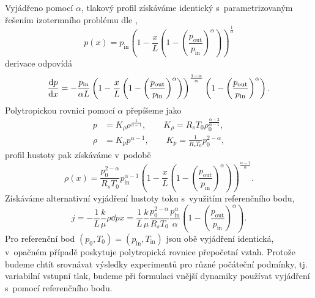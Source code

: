 Vyjádřeno pomocí $\alpha$, tlakový profil získáváme identický s~parametrizovaným řešením izotermního problému dle ,
\begin{equation}
    p(x)=p_{\mathrm{in}}\left(1-\frac{x}{L}\left(1-\left(\frac{p_{\mathrm{out}}}{p_{\mathrm{in}}}\right)^\alpha\right)\right)^{\frac{1}{\alpha}}
\end{equation}
derivace odpovídá
\begin{equation}
    \frac{\mathrm{d} p}{\mathrm{d} x}=-\frac{p_{\mathrm{in}}}{\alpha L}\left(1-\frac{x}{L}\left(1-\left(\frac{p_{\mathrm{out}}}{p_{\mathrm{in}}}\right)^{\alpha}\right)\right)^{\frac{1-\alpha}{\alpha}}\left(1-\left(\frac{p_{\mathrm{out}}}{p_{\mathrm{in}}}\right)^{\alpha}\right).
\end{equation}
Polytropickou rovnici pomocí $\alpha$ přepíšeme jako
\begin{subequations}
    \begin{align}
        p&=K_{\rho} \rho^{\frac{1}{\alpha-1}},\qquad K_\rho = R_s T_0\rho_0^{\frac{\alpha-2}{\alpha-1}},\\
        \rho&=K_p p^{\alpha-1},\qquad K_p=\frac{1}{R_s T_0} p_0^{2-\alpha},
    \end{align}
\end{subequations}
profil hustoty pak získáváme v~podobě
\begin{equation}
    \rho(x)=\frac{p_0^{2-\alpha}}{R_s T_0}p_{\mathrm{in}}^{\alpha-1}\left(1-\frac{x}{L}\left(1-\left(\frac{p_{\mathrm{out}}}{p_{\mathrm{in}}}\right)^{\alpha}\right)\right)^{\frac{\alpha-1}{\alpha}}.
\end{equation}
Získáváme alternativní vyjádření hustoty toku s~využitím referenčního bodu,
\begin{equation}\label{eq:pme_mass_flux_reference}
    j=-\frac{1}{L}\frac{k}{\mu}\rho \dd{p}{x}
    =\frac{1}{L}\frac{k}{\mu}\frac{p_0^{2-\alpha}}{R_s T_0}\frac{p_{\mathrm{in}}^{\alpha}}{\alpha}\left(1-\left(\frac{p_{\mathrm{out}}}{p_{\mathrm{in}}}\right)^{\alpha}\right).
\end{equation}
Pro referenční bod $(p_0,T_0)=(p_{\mathrm{in}},T_{\mathrm{in}})$ jsou obě vyjádření identická, v~opačném případě poskytuje polytropická rovnice přepočetní vztah. Protože budeme chtít srovnávat výsledky experimentů pro různé počáteční podmínky, tj. variabilní vstupní tlak, budeme při formulaci vnější dynamiky používat vyjádření s~pomocí referenčního bodu.


